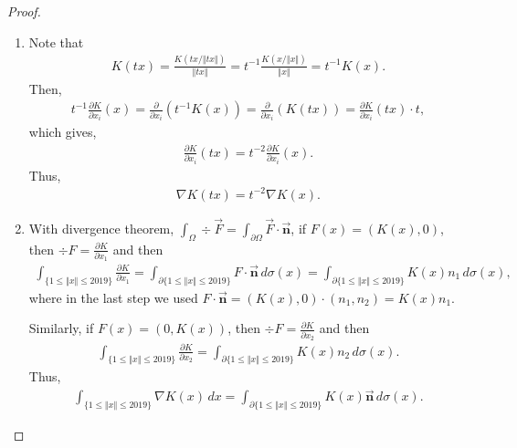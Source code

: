 \documentclass[11pt]{article}
\theoremstyle{definition}
\theoremstyle{definition}
\begin{document}
\begin{proof}
~\begin{enumerate}[label=(\alph*)]
    \item Note that 
    \begin{align*}
        K(tx) = \frac{K(tx/\Vert tx\Vert)}{\Vert tx\Vert} = t^{-1} \frac{K(x/\Vert x\Vert)}{\Vert x\Vert} = t^{-1} K(x).
    \end{align*}
    Then, 
    \begin{align*}
        t^{-1} \frac{\partial K}{\partial x_i}(x) = \frac{\partial }{\partial x_i}(t^{-1} K(x)) = \frac{\partial }{\partial x_i}(K(tx)) = \frac{\partial K}{\partial x_i}(tx) \cdot t,
    \end{align*}
    which gives,
    \begin{align*}
        \frac{\partial K}{\partial x_i}(tx) = t^{-2} \frac{\partial K}{\partial x_i}(x).
    \end{align*}
    Thus,
    \begin{align*}
        \nabla K(tx) = t^{-2} \nabla K(x).
    \end{align*}
    
    \item With divergence theorem, $\int_\Omega \div \vec{F} = \int_{\partial \Omega} \vec{F}\cdot \vec{\mathbf{n}}$, if $F(x) = (K(x), 0)$, then $\div F = \frac{\partial K}{\partial x_1}$ and then
    \begin{align*}
        \int_{\{1\leq \Vert x \Vert\leq 2019\}} \frac{\partial K}{\partial x_1} = \int_{\partial\{1\leq \Vert x \Vert\leq 2019\}} F \cdot \vec{\mathbf{n}} \, d\sigma(x) = \int_{\partial\{1\leq \Vert x \Vert\leq 2019\}} K(x) n_1 \, d\sigma(x),
    \end{align*}
    where in the last step we used $F \cdot \vec{\mathbf{n}} = (K(x), 0)\cdot (n_1, n_2) = K(x) n_1$.
    
    
    Similarly, if $F(x) = (0,K(x))$, then $\div F = \frac{\partial K}{\partial x_2}$ and then
    \begin{align*}
        \int_{\{1\leq \Vert x \Vert\leq 2019\}} \frac{\partial K}{\partial x_2} = \int_{\partial\{1\leq \Vert x \Vert\leq 2019\}} K(x) n_2 \, d\sigma(x).
    \end{align*}
    Thus, 
    \begin{align*}
        \int_{\{1\leq \Vert x\Vert\leq 2019\}} \nabla K(x)\, dx = \int_{\partial \{1\leq \Vert x\Vert\leq 2019\}} K(x)\vec{\mathbf{n}}\, d\sigma(x).
    \end{align*}
    

\end{enumerate}
\end{proof}
\end{document}
